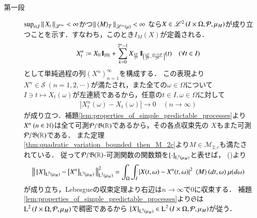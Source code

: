 	\begin{prf}
		\begin{description}
			\item[第一段] $\operatorname*{sup}_{t \in I} \left\|\, X_t\, \right\|_{\mathscr{L}^\infty} < \infty$かつ$\Norm{\inprod<M>_T}{\semiLp{\infty}{\mu}} < \infty$
				なら$X \in \mathscr{L}^{2} \left(I \times \Omega,\mathcal{P},\mu_M\right)$が成り立つことを示す．すなわち，このとき$I_M(X)$が定義される．
				\begin{align}
					X^n_t \coloneqq X_0 \mbox{1}\hspace{-0.25em}\mbox{l}_{\{0\}} + \sum_{k=0}^{2^n-1} X_{\frac{kT}{2^n}} \mbox{1}\hspace{-0.25em}\mbox{l}_{\left( \frac{kT}{2^n}, \frac{(k+1)T}{2^n}\right]}(t)
					\quad (\forall t \in I)
				\end{align}
				として単純過程の列$\left( X^n \right)_{n=1}^{\infty}$を構成する．
				この表現より$X^n \in \mathcal{S}\ (n=1,2,\cdots)$が満たされ，また全ての$\omega \in \Omega$について
				$I \ni t \longmapsto X_t(\omega)$が左連続であるから，任意の$t \in I,\omega \in \Omega$に対して
				\begin{align}
					\left| X^n_t(\omega) - X_t(\omega) \right| \longrightarrow 0
					\quad (n \longrightarrow \infty)
				\end{align}
				が成り立つ．補題\ref{lem:properties_of_simple_predictable_processes}より
				$X^n\ (n \in \mathbb{N})$は全て可測$\mathcal{P}/\mathfrak{B}(\mathbb{R})$であるから，その各点収束先の
				$X$もまた可測$\mathcal{P}/\mathfrak{B}(\mathbb{R})$である．
				また定理\ref{thm:quadratic_variation_bounded_then_M_2c}より$M \in \mathcal{M}_{2,c}$も満たされている．
				従って$\mathcal{P}/\mathfrak{B}(\mathbb{R})$-可測関数の関数類を$\left[\cdot\right]_{\operatorname{L}^{0} \left(\mu_M\right)}$と表せば，
				()より
				\begin{align}
					\Norm{\equiv{X}{\Lp{0}{\mu_M}} - \equiv{X^n}{\Lp{0}{\mu_M}}}{\Lp{2}{\mu_M}}^2
					= \int_\Omega \int_I \left| X(t,\omega) - X^n(t,\omega) \right|^2\ \inprod<M>(dt,\omega)\ \mu(d\omega)
				\end{align}
				が成り立ち，Lebesgueの収束定理より右辺は$n \longrightarrow \infty$で0に収束する．
				補題\ref{lem:properties_of_simple_predictable_processes}より$\mathfrak{S}$は
				$\operatorname{L}^{2} \left(I \times \Omega,\mathcal{P},\mu_M\right)$で稠密であるから
				$\left[X\right]_{\operatorname{L}^{0} \left(\mu_M\right)} \in \operatorname{L}^{2} \left(I \times \Omega,\mathcal{P},\mu_M\right)$が従う．
				

\end{description}
\end{prf}
